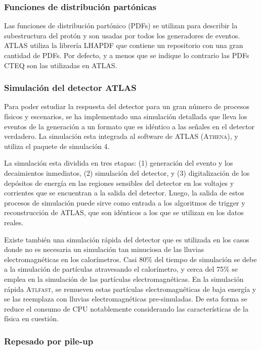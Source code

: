\subsubsection{Funciones de distribución partónicas}

Las funciones de distribución partónico (PDFs) se utilizan para describir la
subestructura del protón y son usadas por todos los generadores de eventos.
ATLAS utiliza la librería LHAPDF\cite{Bourilkov:2006cj} que contiene un
repositorio con una gran
cantidad de PDFs. Por defecto, y a menos que se indique lo contrario las PDFs
CTEQ son las utilizadas en ATLAS.


\subsubsection{Simulación del detector ATLAS}

Para poder estudiar la respuesta del detector para un gran número de procesos
físicos y escenarios, se ha implementado una simulación detallada que lleva los
eventos de la generación a un formato que es idéntico a las señales en el
detector verdadero\cite{AtlasSim}. La simulación esta integrada al software de
ATLAS (\textsc{Athena}), y utiliza el paquete de simulación
{\geant}4\cite{Geant4}.

La simulación esta dividida en tres etapas: (1) generación del evento y los
decaimientos inmediatos, (2) simulación del detector, y (3) digitalización de
los depósitos de energía en las regiones sensibles del detector en los voltajes
y corrientes que se encuentran a la salida del detector. Luego, la salida de
estos procesos de simulación puede sirve como entrada a los algoritmos de
trigger y reconstrucción de ATLAS, que son idénticos a los que se utilizan en
los datos reales.

Existe también una simulación rápida del detector que es utilizada en los casos
donde no es necesaria un simulación tan minuciosa de las lluvias
electromagnéticas en los calorímetros. Casi 80\% del tiempo de simulación se
debe a la simulación de partículas atravesando el calorímetro, y cerca del 75\%
se emplea en la simulación de las partículas electromagnéticas. En la simulación
rápida \textsc{Atlfast}\cite{Richter-Was:683751}, se remueven estas partículas
electromagnéticas de baja energía y se las reemplaza con lluvias
electromagnéticas pre-simuladas. De esta forma se reduce el consumo de CPU
notablemente considerando las características de la física en cuestión.


\subsubsection{Repesado por pile-up}

